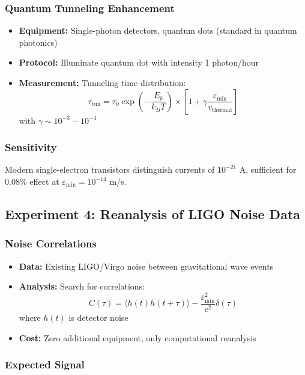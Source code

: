 \documentclass[11pt,a4paper]{article}
\begin{document}
	\subsubsection{Quantum Tunneling Enhancement}
	
	\begin{itemize}
		\item \textbf{Equipment:} Single-photon detectors, quantum dots (standard in quantum photonics)
		\item \textbf{Protocol:} Illuminate quantum dot with intensity 1 photon/hour
		\item \textbf{Measurement:} Tunneling time distribution:
		\[
		\tau_{\text{tun}} = \tau_0 \exp\left(-\frac{E_b}{k_B T}\right) \times \left[1 + \gamma\frac{\varepsilon_{\min}}{v_{\text{thermal}}}\right]
		\]
		with $\gamma \sim 10^{-3} - 10^{-4}$
	\end{itemize}
	
	\subsubsection{Sensitivity}
	
	Modern single-electron transistors distinguish currents of $10^{-21}$ A, sufficient for 0.08\% effect at $\varepsilon_{\min} = 10^{-14}$ m/s.
	
	\subsection{Experiment 4: Reanalysis of LIGO Noise Data}
	
	\subsubsection{Noise Correlations}
	
	\begin{itemize}
		\item \textbf{Data:} Existing LIGO/Virgo noise between gravitational wave events
		\item \textbf{Analysis:} Search for correlations:
		\[
		C(\tau) = \langle h(t)h(t+\tau)\rangle - \frac{\varepsilon_{\min}^2}{c^2}\delta(\tau)
		\]
		where $h(t)$ is detector noise
		\item \textbf{Cost:} Zero additional equipment, only computational reanalysis
	\end{itemize}
	
	\subsubsection{Expected Signal}
	
\end{document}
